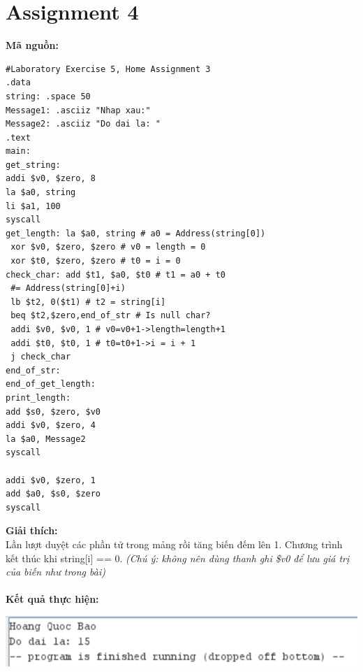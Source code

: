 \documentclass[12pt,a4paper,oneside]{article}
\begin{document}
\section*{Assignment 4}
\textbf{Mã nguồn:}
\begin{lstlisting}
#Laboratory Exercise 5, Home Assignment 3
.data
string: .space 50
Message1: .asciiz "Nhap xau:"
Message2: .asciiz "Do dai la: "
.text
main:
get_string: 
addi $v0, $zero, 8
la $a0, string
li $a1, 100
syscall
get_length: la $a0, string # a0 = Address(string[0])
 xor $v0, $zero, $zero # v0 = length = 0
 xor $t0, $zero, $zero # t0 = i = 0
check_char: add $t1, $a0, $t0 # t1 = a0 + t0 
 #= Address(string[0]+i) 
 lb $t2, 0($t1) # t2 = string[i]
 beq $t2,$zero,end_of_str # Is null char? 
 addi $v0, $v0, 1 # v0=v0+1->length=length+1
 addi $t0, $t0, 1 # t0=t0+1->i = i + 1
 j check_char
end_of_str: 
end_of_get_length:
print_length:
add $s0, $zero, $v0
addi $v0, $zero, 4
la $a0, Message2
syscall

addi $v0, $zero, 1
add $a0, $s0, $zero
syscall
\end{lstlisting}
\textbf{Giải thích: }\\
Lần lượt duyệt các phần tử trong mảng rồi tăng biến đếm lên 1. Chương trình kết thúc khi string[i] == 0. \textit{(Chú ý: không nên dùng thanh ghi \$v0 để lưu giá trị của biến như trong bài)}
\\\\\textbf{Kết quả thực hiện:}
\begin{center}
\includegraphics[scale=1]{4}
\end{center}
\pagebreak
\end{document}
